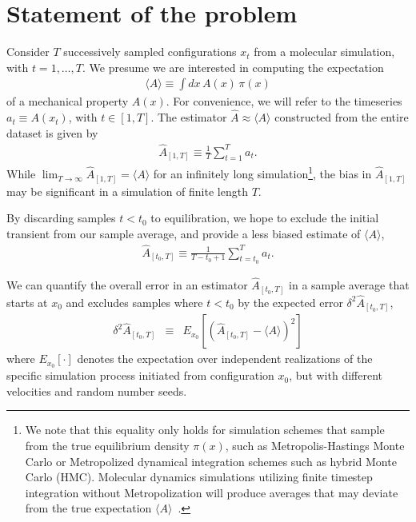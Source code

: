 \documentclass[aps,pre,twocolumn,nofootinbib,superscriptaddress,linenumbers,11point]{revtex4-1}
\newcommand{\expect}[1]{\langle #1 \rangle}                %
\begin{document}
\section*{Statement of the problem}

Consider $T$ successively sampled configurations $x_t$ from a molecular simulation, with $t = 1, \ldots, T$.
We presume we are interested in computing the expectation
\begin{eqnarray}
\expect{A} \equiv \int dx \, A(x) \, \pi(x)
\end{eqnarray}
of a mechanical property $A(x)$.
For convenience, we will refer to the timeseries $a_t \equiv A(x_t)$, with $t \in [1,T]$.
The estimator $\hat{A} \approx \expect{A}$ constructed from the entire dataset is given by
\begin{eqnarray}
\hat{A}_{[1,T]} \equiv \frac{1}{T} \sum_{t=1}^T a_t . \label{equation:time-average}
\end{eqnarray}
While $\lim_{T \rightarrow \infty} \hat{A}_{[1,T]} = \expect{A}$ for an infinitely long simulation\footnote{We note that this equality only holds for simulation schemes that sample from the true equilibrium density $\pi(x)$, such as Metropolis-Hastings Monte Carlo or Metropolized dynamical integration schemes such as hybrid Monte Carlo (HMC). Molecular dynamics simulations utilizing finite timestep integration without Metropolization will produce averages that may deviate from the true expectation $\expect{A}$~\cite{sivak:2013:prx:vvvr}.}, the bias in $\hat{A}_{[1,T]}$ may be significant in a simulation of finite length $T$.

By discarding samples $t < t_0$ to equilibration, we hope to exclude the initial transient from our sample average, and provide a less biased estimate of $\expect{A}$,
\begin{eqnarray}
\hat{A}_{[t_0,T]} \equiv \frac{1}{T-t_0+1} \sum_{t=t_0}^T a_t . \label{equation:production-time-average} 
\end{eqnarray}

We can quantify the overall error in an estimator $\hat{A}_{[t_0,T]}$ in a sample average that starts at $x_0$ and excludes samples where $t < t_0$ by the expected error $\delta^2 \hat{A}_{[t_0,T]}$,
\begin{eqnarray}
\delta^2 \hat{A}_{[t_0,T]} &\equiv& E_{x_0} \left[ \left( \hat{A}_{[t_0,T]} - \expect{A} \right)^2 \right] \label{equation:rms-error} 
\end{eqnarray}
where $E_{x_0}[\cdot]$ denotes the expectation over independent realizations of the specific simulation process initiated from configuration $x_0$, but with different velocities and random number seeds.
\end{document}
